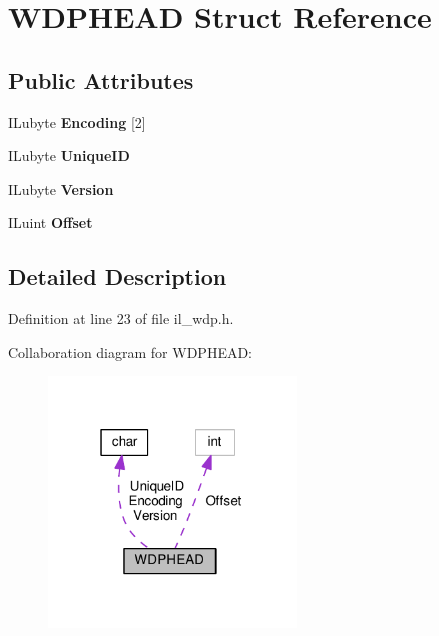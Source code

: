 \hypertarget{structWDPHEAD}{}\section{W\+D\+P\+H\+E\+AD Struct Reference}
\label{structWDPHEAD}
\subsection*{Public Attributes}
\begin{DoxyCompactItemize}
\item 
\mbox{\label{structWDPHEAD_ab7d6b150e26fc8e565d479a1ba6cd3bd}} 
I\+Lubyte {\bfseries Encoding} \mbox{[}2\mbox{]}
\item 
\mbox{\label{structWDPHEAD_ac2a1c9b2779bebeed03a43ee2e8a939a}} 
I\+Lubyte {\bfseries Unique\+ID}
\item 
\mbox{\label{structWDPHEAD_a1f62770a182d840a076baf6a14f2b4c7}} 
I\+Lubyte {\bfseries Version}
\item 
\mbox{\label{structWDPHEAD_abe59df29c41375d0eec83f910ec4d587}} 
I\+Luint {\bfseries Offset}
\end{DoxyCompactItemize}


\subsection{Detailed Description}


Definition at line 23 of file il\+\_\+wdp.\+h.



Collaboration diagram for W\+D\+P\+H\+E\+AD\+:
\nopagebreak
\begin{figure}[H]
\begin{center}
\leavevmode
\includegraphics[width=187pt]{d7/dcb/structWDPHEAD__coll__graph}
\end{center}
\end{figure}


